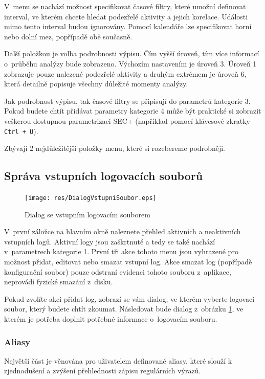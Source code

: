 \documentclass[a4paper,12pt]{article}
\begin{document}
V~menu se nachází možnost specifikovat časové filtry, které umožní definovat interval, ve kterém chcete hledat podezřelé aktivity a jejich korelace. Události mimo tento interval budou ignorovány.
Pomocí kalendáře lze specifikovat horní nebo dolní mez, popřípadě obě současně.

Další položkou je volba podrobnosti výpisu. Čím vyšší úroveň, tím více informací o~průběhu analýzy bude zobrazeno. Výchozím nastavením je úroveň 3. Úroveň 1 zobrazuje pouze nalezené podezřelé aktivity a druhým extrémem je úroveň 6, která detailně popisuje všechny důležité momenty analýzy.

Jak podrobnost výpisu, tak časové filtry se připisují do parametrů kategorie 3. Pokud budete chtít přidávat parametry kategorie 4 může být praktické si zobrazit veškerou dostupnou parametrizaci SEC+ (například pomocí klávesové zkratky \texttt{Ctrl + U}).

Zbývají 2 nejdůležitější položky menu, které si rozebereme podrobněji.

\subsection{Správa vstupních logovacích souborů}
\begin{figure}[h]
  \centering
  \texttt{[image: res/DialogVstupniSoubor.eps]}
  \caption{Dialog se vstupním logovacím souborem}
  \label{fig:DialogVstupniSoubor}
\end{figure}

V~první záložce na hlavním okně naleznete přehled aktivních a neaktivních vstupních logů. Aktivní logy jsou zaškrtnuté a tedy se také nachází v~parametrech kategorie 1. První tři akce tohoto menu jsou vyhrazené pro možnost přidat, editovat nebo smazat vstupní log. Akce smazat log (popřípadě konfigurační soubor) pouze odstraní evidenci tohoto souboru z~aplikace, neprovádí fyzické smazání z~disku.

Pokud zvolíte akci přidat log, zobrazí se vám dialog, ve kterém vyberte logovací soubor, který budete chtít zkoumat. Následovat bude dialog z~obrázku \ref{fig:DialogVstupniSoubor}, ve kterém je potřeba doplnit potřebné informace o~logovacím souboru.

\subsubsection{Aliasy}
Největší část je věnována pro uživatelem definované aliasy, které slouží k zjednodušení a zvýšení přehlednosti zápisu regulárních výrazů. 
\end{document}
